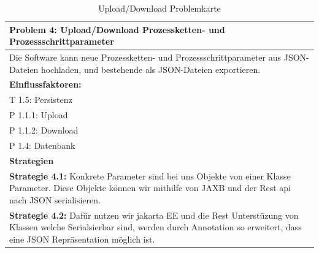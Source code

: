 \documentclass[enabledeprecatedfontcommands,fontsize=12pt,paper=a4,twoside]{scrartcl}
\begin{document}
\begin{table}[H]
    \centering
    \begin{tabular}{|p{15cm}|}
    \hline
          \textbf{Problem 4:} Upload/Download Prozessketten- und Prozessschrittparameter \\ \hline
          Die Software kann neue Prozessketten- und Prozessschrittparameter aus JSON-Dateien hochladen, und bestehende als JSON-Dateien exportieren.
          \\ \hline
          \textbf{Einflussfaktoren: } \\
          T 1.5: Persistenz \\
          P 1.1.1: Upload\\
          P 1.1.2: Download\\
          P 1.4: Datenbank \\
          \hline
          \textbf{Strategien} \\ \hline
          \textbf{Strategie 4.1:}  Konkrete Parameter sind bei uns Objekte von einer Klasse Parameter. Diese Objekte können wir mithilfe von JAXB und der Rest api nach JSON serialisieren. \\ 
          \textbf{Strategie 4.2:} Dafür nutzen wir jakarta EE und die Rest Unterstüzung von Klassen welche Serialsierbar sind, werden durch Annotation so erweitert, dass eine JSON Repräsentation möglich ist. 
          \\ \hline
    \end{tabular}



    \caption{Upload/Download Problemkarte}
    \label{tab:ProblemKarte4}

\end{table}
\end{document}
